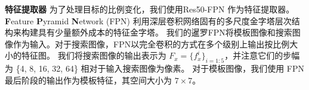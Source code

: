 \textbf{特征提取器} 为了处理目标的比例变化，我们使用Res50-FPN \cite{lin2017feature} 作为特征提取器。
\textbf{F}eature \textbf{P}yramid \textbf{N}etwork (FPN) 利用深层卷积网络固有的多尺度金字塔层次结构来构建具有少量额外成本的特征金字塔。
我们的暹罗FPN将模板图像和搜索图像作为输入。对于搜索图像，FPN以完全卷积的方式在多个级别上输出按比例大小的特征图。
我们将搜索图像的输出表示为 $F_{x} = \{f_{x}^i\}_{i=1:5}$，并注意它们的步幅为 \{4, 8, 16, 32, 64\} 相对于输入搜索图像为像素。
对于模板图像，我们使用 FPN 最后阶段的输出作为模板特征，其空间大小为 $7 \times 7$。

